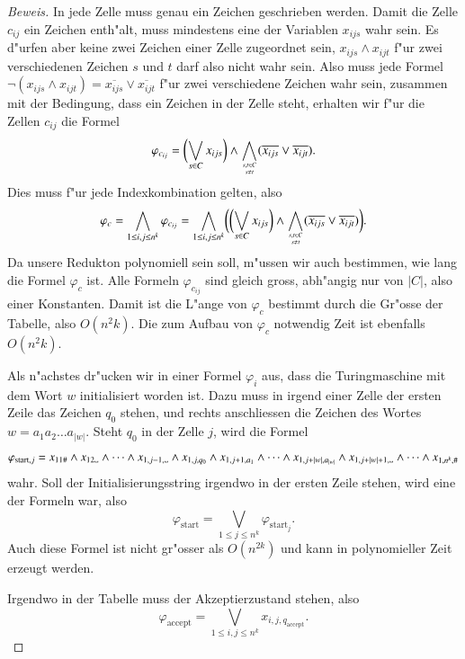 \begin{proof}[Beweis]
In jede Zelle muss genau ein Zeichen geschrieben werden. Damit die Zelle
$c_{ij}$ ein Zeichen enth"alt, muss mindestens eine der Variablen $x_{ijs}$
wahr sein. Es d"urfen aber keine zwei Zeichen einer Zelle zugeordnet sein,
$x_{ijs}\wedge x_{ijt}$ f"ur zwei verschiedenen Zeichen $s$ und $t$ darf
also nicht wahr sein. Also muss jede Formel
$\neg(x_{ijs}\wedge x_{ijt})=\overline{x_{ijs}}\vee\overline{x_{ijt}}$
f"ur zwei verschiedene Zeichen wahr sein, zusammen mit der
Bedingung, dass ein Zeichen in der Zelle steht, erhalten wir
f"ur die Zellen $c_{ij}$ die Formel
\[
\varphi_{c_{ij}}=
\biggl(\bigvee_{s\in C} x_{ijs}\biggr)\wedge
\bigwedge_{s,t\in C\atop s\ne t} (\overline{x_{ijs}}\vee\overline{x_{ijt}}).
\]
Dies muss f"ur jede Indexkombination gelten, also
\[
\varphi_c
=
\bigwedge_{1\le i,j\le n^k}
\varphi_{c_{ij}}
=
\bigwedge_{1\le i,j\le n^k}\biggl(
\biggl(\bigvee_{s\in C} x_{ijs}\biggr)\wedge
\bigwedge_{s,t\in C\atop s\ne t} (\overline{x_{ijs}}\vee\overline{x_{ijt}})
\biggr).
\]
Da unsere Redukton polynomiell sein soll, m"ussen wir auch bestimmen,
wie lang die Formel $\varphi_c$ ist. Alle Formeln $\varphi_{c_{ij}}$
sind gleich gross, abh"angig nur von $|C|$, also einer Konstanten.
Damit ist die L"ange von $\varphi_c$ bestimmt durch die Gr"osse der
Tabelle, also $O(n^2k)$. Die zum Aufbau von $\varphi_c$ notwendig Zeit
ist ebenfalls $O(n^2k)$.

Als n"achstes dr"ucken wir in einer Formel $\varphi_i$ aus,
dass die Turingmaschine mit dem
Wort $w$ initialisiert worden ist. Dazu muss in irgend einer
Zelle der ersten Zeile das Zeichen $q_0$ stehen, und rechts
anschliessen die Zeichen des Wortes $w=a_1a_2\dots a_{|w|}$.
Steht $q_0$ in der
Zelle $j$, wird die Formel
\[
\varphi_{\text{start},j}
=
x_{11\#}\wedge
x_{12\blank}\wedge \dots \wedge
x_{1,j-1,\blank}\wedge
x_{1,j,q_0}\wedge
x_{1,j+1,a_1}\wedge\dots\wedge
x_{1,j+|w|,a_{|w|}}\wedge
x_{1,j+|w|+1,\blank}\wedge\dots\wedge
x_{1,n^k,\#}
\]
wahr.
Soll der Initialisierungsstring irgendwo in der ersten Zeile
stehen, wird eine der Formeln war, also
\[
\varphi_{\text{start}} = \bigvee_{1\le j\le n^k} \varphi_{\text{start}_j}.
\]
Auch diese Formel ist nicht gr"osser als $O(n^{2k})$ und kann in
polynomieller Zeit erzeugt werden.

Irgendwo in der Tabelle muss der Akzeptierzustand stehen, also
\[
\varphi_{\text{accept}} 
=
\bigvee_{1\le i,j\le n^k} x_{i,j,q_{\text{accept}}}.
\]


\end{proof}
